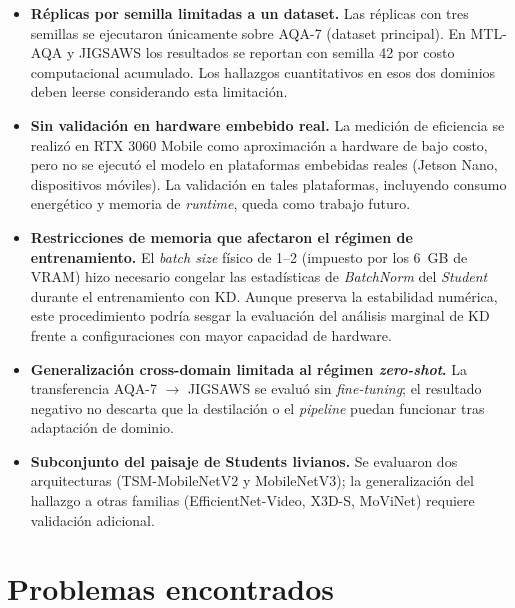 \begin{itemize}
    \item \textbf{Réplicas por semilla limitadas a un dataset.} Las réplicas con tres semillas se ejecutaron únicamente sobre AQA-7 (dataset principal). En MTL-AQA y JIGSAWS los resultados se reportan con semilla 42 por costo computacional acumulado. Los hallazgos cuantitativos en esos dos dominios deben leerse considerando esta limitación.

    \item \textbf{Sin validación en hardware embebido real.} La medición de eficiencia se realizó en RTX 3060 Mobile como aproximación a hardware de bajo costo, pero no se ejecutó el modelo en plataformas embebidas reales (Jetson Nano, dispositivos móviles). La validación en tales plataformas, incluyendo consumo energético y memoria de \textit{runtime}, queda como trabajo futuro.

    \item \textbf{Restricciones de memoria que afectaron el régimen de entrenamiento.} El \textit{batch size} físico de 1--2 (impuesto por los 6~GB de \ac{VRAM}) hizo necesario congelar las estadísticas de \textit{BatchNorm} del \textit{Student} durante el entrenamiento con \ac{KD}. Aunque preserva la estabilidad numérica, este procedimiento podría sesgar la evaluación del análisis marginal de \ac{KD} frente a configuraciones con mayor capacidad de hardware.

    \item \textbf{Generalización cross-domain limitada al régimen \textit{zero-shot}.} La transferencia AQA-7 $\to$ JIGSAWS se evaluó sin \textit{fine-tuning}; el resultado negativo no descarta que la destilación o el \textit{pipeline} puedan funcionar tras adaptación de dominio.

    \item \textbf{Subconjunto del paisaje de Students livianos.} Se evaluaron dos arquitecturas (TSM-MobileNetV2 y MobileNetV3); la generalización del hallazgo a otras familias (EfficientNet-Video, X3D-S, MoViNet) requiere validación adicional.
\end{itemize}

\section{Problemas encontrados}

